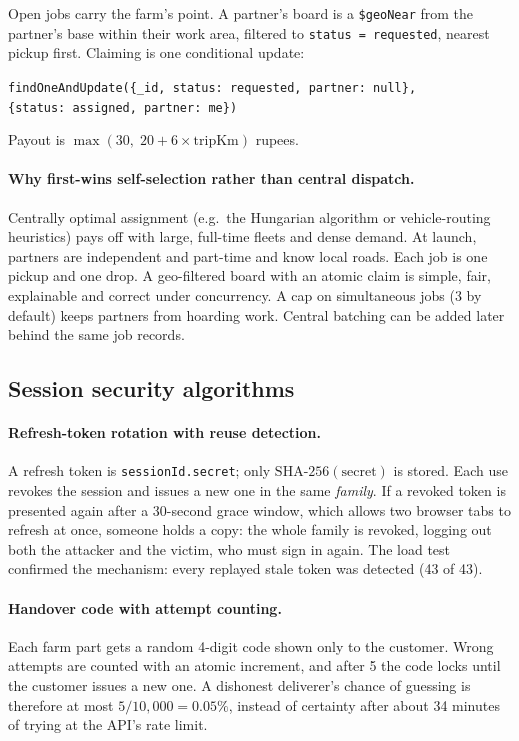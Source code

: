 \documentclass[11pt,a4paper]{article}
\begin{document}
Open jobs carry the farm's point. A partner's board is a \texttt{\$geoNear} from the partner's base within their work area, filtered to \texttt{status = requested}, nearest pickup first. Claiming is one conditional update:
\begin{center}\small
\texttt{findOneAndUpdate(\{\_id, status: requested, partner: null\},}\\
\texttt{\phantom{findOneAndUpdate(}\{status: assigned, partner: me\})}
\end{center}
Payout is $\max(30,\; 20 + 6 \times \text{tripKm})$ rupees.

\paragraph{Why first-wins self-selection rather than central dispatch.} Centrally optimal assignment (e.g.\ the Hungarian algorithm or vehicle-routing heuristics) pays off with large, full-time fleets and dense demand. At launch, partners are independent and part-time and know local roads. Each job is one pickup and one drop. A geo-filtered board with an atomic claim is simple, fair, explainable and correct under concurrency. A cap on simultaneous jobs (3 by default) keeps partners from hoarding work. Central batching can be added later behind the same job records.

\subsection{Session security algorithms}

\paragraph{Refresh-token rotation with reuse detection.} A refresh token is \texttt{sessionId.secret}; only $\text{SHA-256}(\text{secret})$ is stored. Each use revokes the session and issues a new one in the same \emph{family}. If a revoked token is presented again after a 30-second grace window, which allows two browser tabs to refresh at once, someone holds a copy: the whole family is revoked, logging out both the attacker and the victim, who must sign in again. The load test confirmed the mechanism: every replayed stale token was detected (43 of 43).

\paragraph{Handover code with attempt counting.} Each farm part gets a random 4-digit code shown only to the customer. Wrong attempts are counted with an atomic increment, and after 5 the code locks until the customer issues a new one. A dishonest deliverer's chance of guessing is therefore at most $5/10{,}000 = 0.05\%$, instead of certainty after about 34 minutes of trying at the API's rate limit.
\end{document}
